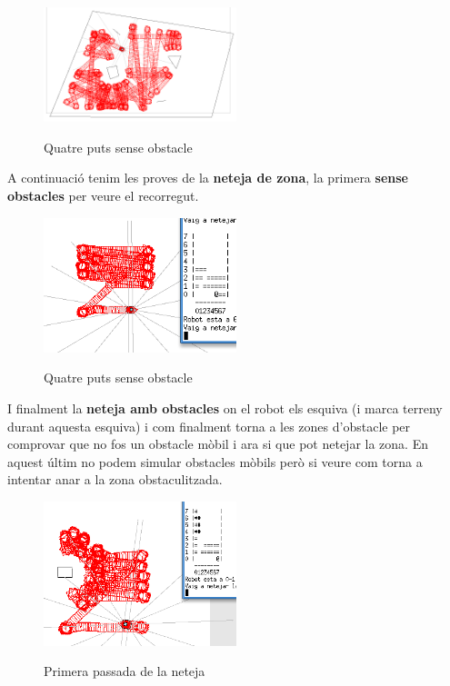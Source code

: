 \begin{figure}[H]
\begin{center}\label{vagant}
 \includegraphics[width=0.5\textwidth]{diagrames/figures/vagant.png}
\end{center}
  \caption{Quatre puts sense obstacle}
\end{figure}

A continuació tenim les proves de la \textbf{neteja de zona}, la primera \textbf{sense obstacles} per veure el recorregut.

\begin{figure}[H]
\begin{center}\label{neteja}
 \includegraphics[width=0.5\textwidth]{diagrames/figures/netNoObs.png}
\end{center}
  \caption{Quatre puts sense obstacle}
\end{figure}

I finalment la \textbf{neteja amb obstacles} on el robot els esquiva (i marca terreny durant aquesta esquiva)
i com finalment torna a les zones d'obstacle per comprovar que no fos un
obstacle mòbil i ara si que pot netejar la zona. En aquest últim no podem
simular obstacles mòbils però si veure com torna a intentar anar a la zona
obstaculitzada.

\begin{figure}[H]
\begin{center}\label{netejaobs}
 \includegraphics[width=0.5\textwidth]{diagrames/figures/netejant.png}
\end{center}
  \caption{Primera passada de la neteja}
\end{figure}

